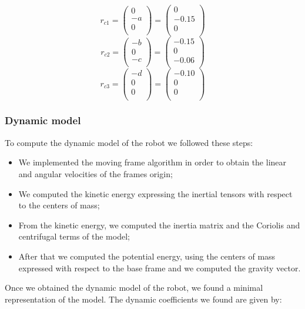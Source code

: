 \documentclass{article}
\begin{document}
\[r_{c1}=\begin{pmatrix}
0\\
-a\\
0\\
\end{pmatrix} = \begin{pmatrix}
0\\
-0.15\\
0\\
\end{pmatrix}
\]
\[r_{c2}=\begin{pmatrix}
-b\\
0\\
-c\\
\end{pmatrix} = \begin{pmatrix}
-0.15\\
0\\
-0.06\\
\end{pmatrix}
\]
\[r_{c3}=\begin{pmatrix}
-d\\
0\\
0\\
\end{pmatrix} = \begin{pmatrix}
-0.10\\
0\\
0\\
\end{pmatrix}
\]
\subsubsection*{Dynamic model}
To compute the dynamic model of the robot we followed these steps:
\begin{itemize}
\item We implemented the moving frame algorithm in order to obtain the linear and angular velocities of the frames origin;
\item We computed the kinetic energy expressing the inertial tensors with respect to the centers of mass;
\item From the kinetic energy, we computed the inertia matrix and the Coriolis and centrifugal terms of the model;
\item After that we computed the potential energy, using the centers of mass expressed with respect to the base frame and we computed the gravity vector.
\end{itemize}
Once we obtained the dynamic model of the robot, we found a minimal representation of the model. The dynamic coefficients we found are given by:
\end{document}
